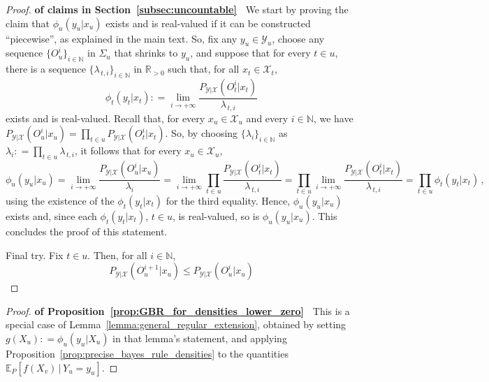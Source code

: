 \documentclass[twoside,11pt]{article}
\newcommand{\nats}{\mathbb{N}}
\newcommand{\reals}{\mathbb{R}}
\newcommand{\realspos}{\reals_{>0}}
\newcommand{\states}{\mathcal{X}}
\newcommand{\observs}{\mathcal{Y}}
\newcommand{\coloneqq}{:\!=}
\begin{document}
\begin{proof}{\bf of claims in Section~\ref{subsec:uncountable}~}
We start by proving the claim that $\phi_u(y_u\vert x_u)$ exists and is real-valued if it can be constructed ``piecewise'', as explained in the main text. So, fix any $y_u\in\observs_u$, choose any sequence $\{O_u^i\}_{i\in\nats}$ in $\Sigma_u$  that shrinks to $y_u$, and suppose that for every $t\in u$, there is a sequence $\{\lambda_{\,t,i}\}_{i\in\nats}$ in $\realspos$ such that, for all $x_t\in\states_t$,
\begin{equation*}
\phi_t(y_t\vert x_t) \coloneqq \lim_{i\to+\infty} \frac{P_{\observs\vert\states}(O_t^i\vert x_t)}{\lambda_{\,t,i}}
\end{equation*}
exists and is real-valued. Recall that, for every $x_u\in\states_u$ and every $i\in\nats$, we have $P_{\observs\vert\states}(O_u^i\vert x_u)=\prod_{t\in u}P_{\observs\vert\states}(O_t^i\vert x_t)$. So, by choosing $\{\lambda_i\}_{i\in\nats}$ as $\lambda_i\coloneqq \prod_{t\in u}\lambda_{\,t,i}$, it follows that for every $x_u\in\states_u$,
\begin{equation*}
\phi_u(y_u\vert x_u) = \lim_{i\to+\infty} \frac{P_{\observs\vert\states}(O_u^i\vert x_u)}{\lambda_i} = \lim_{i\to+\infty} \prod_{t\in u}\frac{P_{\observs\vert\states}(O_t^i\vert x_t)}{\lambda_{\,t,i}} = \prod_{t\in u}\lim_{i\to+\infty} \frac{P_{\observs\vert\states}(O_t^i\vert x_t)}{\lambda_{\,t,i}} = \prod_{t\in u} \phi_t(y_t\vert x_t)\,,
\end{equation*}
using the existence of the $\phi_t(y_t\vert x_t)$ for the third equality. Hence, $\phi_u(y_u\vert x_u)$ exists and, since each $\phi_t(y_t\vert x_t)$, $t\in u$, is real-valued, so is $\phi_u(y_u\vert x_u)$. This concludes the proof of this statement.

Final try. Fix $t\in u$. Then, for all $i\in\nats$,
\begin{equation*}
P_{\observs\vert\states}(O_u^{i+1}\vert x_u) \leq P_{\observs\vert\states}(O_u^{i}\vert x_u)
\end{equation*}
\end{proof}

\begin{proof}{\bf of Proposition~\ref{prop:GBR_for_densities_lower_zero}~}
This is a special case of Lemma~\ref{lemma:general_regular_extension}, obtained by setting $g(X_u)\coloneqq \phi_u(y_u\vert X_u)$ in that lemma's statement, and applying Proposition~\ref{prop:precise_bayes_rule_densities} to the quantities $\mathbb{E}_P[f(X_v)\,\vert\,Y_u=y_u]$.
\end{proof}
\end{document}
